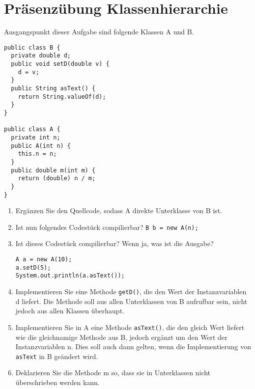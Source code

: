 \chapter{Präsenzübung Klassenhierarchie}

Ausgangspunkt dieser Aufgabe sind folgende Klassen A und B.

\begin{lstlisting}
public class B {
  private double d;
  public void setD(double v) {
    d = v;
  }
  public String asText() {
    return String.valueOf(d);
  }
}

public class A {
  private int n;
  public A(int n) {
    this.n = n;
  }
  public double m(int m) {
    return (double) n / m;
  }
}
\end{lstlisting}

\begin{enumerate}
    \item Ergänzen Sie den Quellcode, sodass A direkte Unterklasse von B ist.
    \item Ist nun folgendes Codestück compilierbar? \lstinline{B b = new A(n);}
    \item Ist dieses Codestück compilierbar? Wenn ja, was ist die Ausgabe? \newline
    \begin{lstlisting}
A a = new A(10);
a.setD(5);
System.out.println(a.asText());
\end{lstlisting}
\item Implementieren Sie eine Methode \lstinline{getD()}, die den Wert der Instanzvariablen d liefert. Die
Methode soll aus allen Unterklassen von B aufrufbar sein, nicht jedoch aus allen Klassen überhaupt.
\item Implementieren Sie in A eine Methode \lstinline{asText()}, die den gleich Wert liefert wie die gleichnamige Methode aus B, jedoch ergänzt um den Wert der Instanzvariablen n. Dies soll auch dann
gelten, wenn die Implementierung von \lstinline{asText} in B geändert wird.
\item Deklarieren Sie die Methode m so, dass sie in Unterklassen nicht überschrieben werden kann.
\end{enumerate}